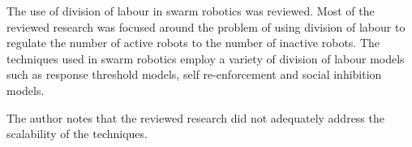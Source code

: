 The use of division of labour in swarm robotics was reviewed. Most of the reviewed research was focused around the problem of using division of labour to regulate the number of active robots to the number of inactive robots. The techniques used in swarm robotics employ a variety of division of labour models such as response threshold models, self re-enforcement and social inhibition models. 

The author notes that the reviewed research did not adequately address the scalability of the techniques.
